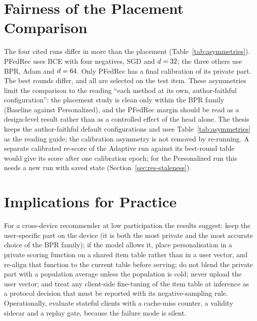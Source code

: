 \section{Fairness of the Placement Comparison}
\label{sec:disc-fairness}

The four cited runs differ in more than the placement (Table~\ref{tab:asymmetries}). PFedRec
uses BCE with four negatives, SGD and $d=32$; the three others use BPR, Adam and
$d=64$. Only PFedRec has a final calibration of its private part. The best rounds differ,
and all are selected on the test item. These asymmetries limit the comparison to the reading
``each method at its own, author-faithful configuration'': the placement study is clean only
within the BPR family (Baseline against Personalized), and the PFedRec margin should be read as
a design-level result rather than as a controlled effect of the head alone. The thesis keeps the author-faithful default configurations and uses
Table~\ref{tab:asymmetries} as the reading guide; the calibration asymmetry is not removed by
re-running. A separate calibrated re-score of the Adaptive run against its best-round table
would give its score after one calibration epoch; for the Personalized run this needs a new run
with saved state (Section~\ref{sec:res-staleness}).

\begin{table}[htbp]
  \caption{Configuration asymmetries between the four cited runs.}
  \label{tab:asymmetries}
  \centering\small
  \fittable{}
\end{table}

\section{Implications for Practice}
\label{sec:disc-practice}

For a cross-device recommender at low participation the results suggest: keep the user-specific
part on the device (it is both the most private and the most accurate choice of the BPR family);
if the model allows it, place personalisation in a private scoring function on a shared item
table rather than in a user vector, and re-align that function to the current table before
serving; do not blend the private part with a population average unless the population is
cold; never upload the user vector; and treat any client-side fine-tuning of the item table at
inference as a protocol decision that must be reported with its negative-sampling rule.
Operationally, evaluate stateful clients with a cache-miss counter, a validity sidecar and a
replay gate, because the failure mode is silent.

